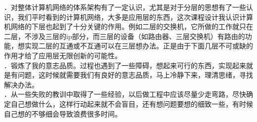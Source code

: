 ．对整体计算机网络的体系架构有了一定认识，尤其是对于分层的思想有了一些认识，我们平时看到的计算机网络，大多是应用层的东西，这次课程设计我认识计算机网络的下层也起到了十分关键的作用。例如二层的交换机，它所做的工作就只在二层，不涉及三层的ip部分，而三层的设备（如路由器、三层交换机）有路由的功能，想实现二层的互通或不互通可以在三层想办法。正是由于下面几层不可或缺的作用才给了应用层无限创新的可能性。\\
．锻炼了我的意志品质。过程也遇到了一些障碍，想起来可行的东西，实现起来就是有问题，这时候就需要我们有良好的意志品质，马上冷静下来，理清思绪，寻找解决办法。\\
．从一些失败的教训中取得了一些经验，以后做工程中应该尽量少走弯路，尽快确定自己想做什么，这样行动起来就不会盲目，还有想问题要想的细致一些，有时候自己想的不够细会导致浪费很多时间。\\
